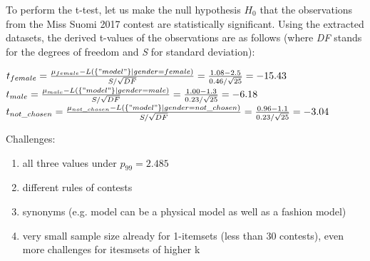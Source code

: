 To perform the t-test, let us make the null hypothesis \emph{$H_0$} that the observations from the Miss Suomi 2017 contest are statistically significant. Using the extracted datasets, the derived t-values of the observations are as follows (where \emph{DF} stands for the degrees of freedom and \emph{S} for standard deviation): 

\begin{center}
    $t_{female}=
        \frac{\mu_{female} - L(\{"model"\}|gender=female)}{S/\sqrt{DF}} = 
        \frac{1.08-2.5}{0.46/\sqrt{25}}=-15.43$ \\

    $t_{male}=
    \frac{\mu_{male} - L(\{"model"\}|gender=male)}{S/\sqrt{DF}} = 
    \frac{1.00-1.3}{0.23/\sqrt{25}}=-6.18$ \\

    $t_{not\_chosen}=
    \frac{\mu_{not\_chosen} - L(\{"model"\}|gender=not\_chosen)}{S/\sqrt{DF}}=
    \frac{0.96-1.1}{0.23/\sqrt{25}}=-3.04$
\end{center}

Challenges: 
\begin{enumerate}
    \item all three values under $p_99 = 2.485$ 
    \item different rules of contests
    \item synonyms (e.g. model can be a physical model as well as a fashion model)
    \item very small sample size already for 1-itemsets (less than 30 contests), even more challenges for itesmsets of higher k
\end{enumerate}
